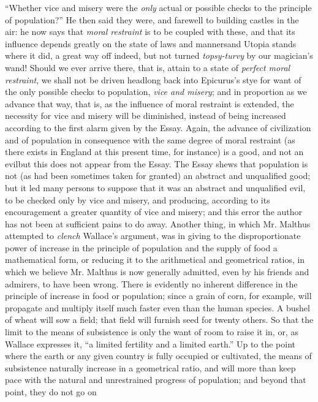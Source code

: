 ``Whether vice and misery were the \emph{only} actual or possible
checks to the principle of population?'' He then said they were,
and farewell to building castles in the air: he now says that
\emph{moral restraint} is to be coupled with these, and that its
influence depends greatly on the state of laws and
manners\textemdash and Utopia stands where it did, a great way off
indeed, but not turned \emph{topsy-turvy} by our magician's wand!
Should we ever arrive there, that is, attain to a state of
\emph{perfect moral restraint}, we shall not be driven headlong
back into Epicurus's stye for want of the only possible checks to
population, \emph{vice and misery}; and in proportion as we
advance that way, that is, as the influence of moral restraint is
extended, the necessity for vice and misery will be diminished,
instead of being increased according to the first alarm given by
the Essay. Again, the advance of civilization and of population in
consequence with the same degree of moral restraint (as there
exists in England at this present time, for instance) is a good,
and not an evil\textemdash but this does not appear from the
Essay. The Essay shews that population is not (as had been
sometimes taken for granted) an abstract and unqualified good; but
it led many persons to suppose that it was an abstract and
unqualified evil, to be checked only by vice and misery, and
producing, according to its encouragement a greater quantity of
vice and misery; and this error the author has not been at
sufficient pains to do away. Another thing, in which Mr. Malthus
attempted to \emph{clench} Wallace's argument, was in giving to
the disproportionate power of increase in the principle of
population and the supply of food a mathematical form, or reducing
it to the arithmetical and geometrical ratios, in which we believe
Mr. Malthus is now generally admitted, even by his friends and
admirers, to have been wrong. There is evidently no inherent
difference in the principle of increase in food or population;
since a grain of corn, for example, will propagate and multiply
itself much faster even than the human species.  A bushel of wheat
will sow a field; that field will furnish seed for twenty
others. So that the limit to the means of subsistence is only the
want of room to raise it in, or, as Wallace expresses it, ``a
limited fertility and a limited earth.'' Up to the point where the
earth or any given country is fully occupied or cultivated, the
means of subsistence naturally increase in a geometrical ratio,
and will more than keep pace with the natural and unrestrained
progress of population; and beyond that point, they do not go on
